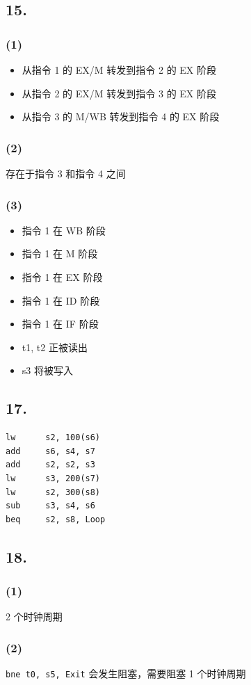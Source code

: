 \documentclass[12pt, a4paper]{ctexart}
\begin{document}
\subsection*{15.}

\subsubsection*{(1)}

\begin{itemize}
    \item 从指令 1 的 EX/M 转发到指令 2 的 EX 阶段
    \item 从指令 2 的 EX/M 转发到指令 3 的 EX 阶段
    \item 从指令 3 的 M/WB 转发到指令 4 的 EX 阶段
\end{itemize}

\subsubsection*{(2)}

存在于指令 3 和指令 4 之间

\subsubsection*{(3)}

\begin{itemize}
    \item 指令 1 在 WB 阶段
    \item 指令 1 在 M 阶段
    \item 指令 1 在 EX 阶段
    \item 指令 1 在 ID 阶段
    \item 指令 1 在 IF 阶段
\end{itemize}

\begin{itemize}
    \item t1, t2 正被读出
    \item s3 将被写入
\end{itemize}

\subsection*{17.}

\begin{lstlisting}[language={[RISC-V]Assembler}]
lw      s2, 100(s6)
add     s6, s4, s7
add     s2, s2, s3
lw      s3, 200(s7)
lw      s2, 300(s8)
sub     s3, s4, s6
beq     s2, s8, Loop
\end{lstlisting}

\subsection*{18.}

\subsubsection*{(1)}

2 个时钟周期

\subsubsection*{(2)}

\texttt{bne t0, s5, Exit} 会发生阻塞，需要阻塞 1 个时钟周期
\end{document}
